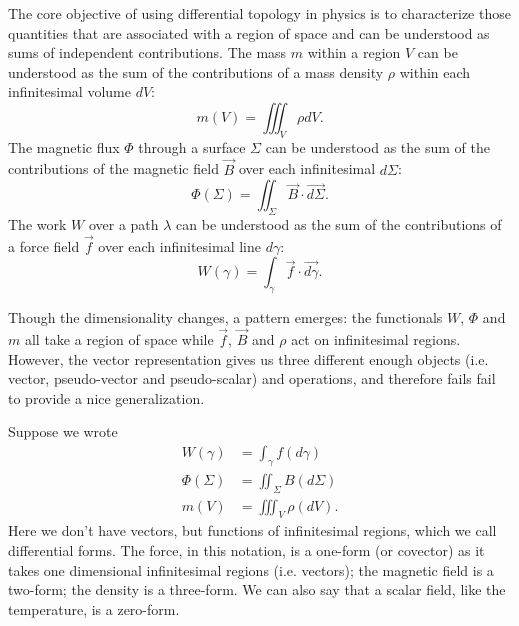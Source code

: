 \documentclass[10pt,twocolumn, nofootinbib]{revtex4-2}
\begin{document}

The core objective of using differential topology in physics is to characterize those quantities that are associated with a region of space and can be understood as sums of independent contributions. The mass $m$ within a region $V$ can be understood as the sum of the contributions of a mass density $\rho$ within each infinitesimal volume $dV$:
\begin{equation*}
	m(V) = \iiint_V \rho dV.
\end{equation*}
The magnetic flux $\Phi$ through a surface $\Sigma$ can be understood as the sum of the contributions of the magnetic field $\vec{B}$ over each infinitesimal $d\Sigma$:
\begin{equation*}
	\Phi(\Sigma) = \iint_\Sigma \vec{B} \cdot \vec{d\Sigma}.
\end{equation*}
The work $W$ over a path $\lambda$ can be understood as the sum of the contributions of a force field $\vec{f}$ over each infinitesimal line $d\gamma$:
\begin{equation*}
	W(\gamma) = \int_\gamma \vec{f} \cdot \vec{d\gamma}.
\end{equation*}

Though the dimensionality changes, a pattern emerges: the functionals $W$, $\Phi$ and $m$ all take a region of space while $\vec{f}$, $\vec{B}$ and $\rho$ act on infinitesimal regions. However, the vector representation gives us three different enough objects (i.e. vector, pseudo-vector and pseudo-scalar) and operations, and therefore fails fail to provide a nice generalization.

Suppose we wrote
\begin{equation*}
\begin{aligned}
	W(\gamma) &= \int_\gamma f(d\gamma) \\
	\Phi(\Sigma) &= \iint_\Sigma B(d\Sigma) \\
	m(V) &= \iiint_V \rho(dV).
\end{aligned}
\end{equation*}
Here we don't have vectors, but functions of infinitesimal regions, which we call differential forms. The force, in this notation, is a one-form (or covector) as it takes one dimensional infinitesimal regions (i.e. vectors); the magnetic field is a two-form; the density is a three-form. We can also say that a scalar field, like the temperature, is a zero-form.
\end{document}
